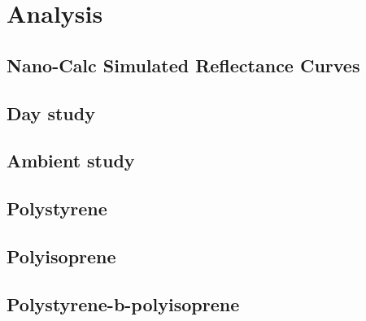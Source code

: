 \documentclass[MasterThesisMain.tex]{subfiles}
\begin{document}
	\chapter{Analysis}
	
	\section{Nano-Calc Simulated Reflectance Curves}
	
	\section{Day study}
	
	\section{Ambient study}
	
	\section{Polystyrene}
	
	\section{Polyisoprene}
	
	\section{Polystyrene-b-polyisoprene}
\end{document}

